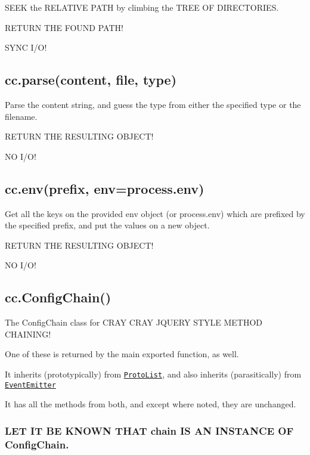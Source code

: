S\+E\+E\+K the R\+E\+L\+A\+T\+I\+V\+E P\+A\+T\+H by climbing the T\+R\+E\+E O\+F D\+I\+R\+E\+C\+T\+O\+R\+I\+E\+S.

R\+E\+T\+U\+R\+N T\+H\+E F\+O\+U\+N\+D P\+A\+T\+H!

S\+Y\+N\+C I/\+O!

\subsection*{cc.\+parse(content, file, type)}

Parse the content string, and guess the type from either the specified type or the filename.

R\+E\+T\+U\+R\+N T\+H\+E R\+E\+S\+U\+L\+T\+I\+N\+G O\+B\+J\+E\+C\+T!

N\+O I/\+O!

\subsection*{cc.\+env(prefix, env=process.\+env)}

Get all the keys on the provided env object (or process.\+env) which are prefixed by the specified prefix, and put the values on a new object.

R\+E\+T\+U\+R\+N T\+H\+E R\+E\+S\+U\+L\+T\+I\+N\+G O\+B\+J\+E\+C\+T!

N\+O I/\+O!

\subsection*{cc.\+Config\+Chain()}

The Config\+Chain class for C\+R\+A\+Y C\+R\+A\+Y J\+Q\+U\+E\+R\+Y S\+T\+Y\+L\+E M\+E\+T\+H\+O\+D C\+H\+A\+I\+N\+I\+N\+G!

One of these is returned by the main exported function, as well.

It inherits (prototypically) from \href{https://github.com/isaacs/proto-list/}{\tt Proto\+List}, and also inherits (parasitically) from \href{http://nodejs.org/api/events.html#events_class_events_eventemitter}{\tt Event\+Emitter}

It has all the methods from both, and except where noted, they are unchanged.

\subsubsection*{L\+E\+T I\+T B\+E K\+N\+O\+W\+N T\+H\+A\+T chain I\+S A\+N I\+N\+S\+T\+A\+N\+C\+E O\+F Config\+Chain.}


